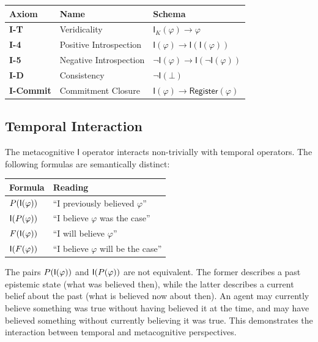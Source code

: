 \documentclass[../LogosReference.tex]{subfiles}
\begin{document}
\begin{center}
\begin{tabular}{lll}
\toprule
\textbf{Axiom} & \textbf{Name} & \textbf{Schema} \\
\midrule
\textbf{I-T} & Veridicality & $\mathsf{I}_K(\varphi) \to \varphi$ \\
\textbf{I-4} & Positive Introspection & $\mathsf{I}(\varphi) \to \mathsf{I}(\mathsf{I}(\varphi))$ \\
\textbf{I-5} & Negative Introspection & $\neg\mathsf{I}(\varphi) \to \mathsf{I}(\neg\mathsf{I}(\varphi))$ \\
\textbf{I-D} & Consistency & $\neg\mathsf{I}(\bot)$ \\
\textbf{I-Commit} & Commitment Closure & $\mathsf{I}(\varphi) \to \mathsf{Register}(\varphi)$ \\
\bottomrule
\end{tabular}
\end{center}


\subsection{Temporal Interaction}\label{sec:reflection-temporal}

The metacognitive $\mathsf{I}$ operator interacts non-trivially with temporal operators.
The following formulas are semantically distinct:

\begin{center}
\begin{tabular}{ll}
\toprule
\textbf{Formula} & \textbf{Reading} \\
\midrule
$P(\mathsf{I}(\varphi))$ & ``I previously believed $\varphi$'' \\
$\mathsf{I}(P(\varphi))$ & ``I believe $\varphi$ was the case'' \\
$F(\mathsf{I}(\varphi))$ & ``I will believe $\varphi$'' \\
$\mathsf{I}(F(\varphi))$ & ``I believe $\varphi$ will be the case'' \\
\bottomrule
\end{tabular}
\end{center}

\begin{remark}
The pairs $P(\mathsf{I}(\varphi))$ and $\mathsf{I}(P(\varphi))$ are not equivalent.
The former describes a past epistemic state (what was believed then),
while the latter describes a current belief about the past (what is believed now about then).
An agent may currently believe something was true without having believed it at the time,
and may have believed something without currently believing it was true.
This demonstrates the interaction between temporal and metacognitive perspectives.
\end{remark}
\end{document}
